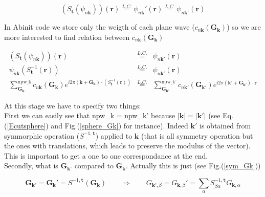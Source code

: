 \documentclass[a4paper,12pt]{report}
\begin{document}
\begin{equation}
\left( S_{\mathbf{t}} \left( \psi_{n\mathbf{k}}\right) \right) (\mathbf{r}) \stackrel{L.C.}{=} \psi_{n\mathbf{k}}'(\mathbf{r}) \stackrel{L.C.}{=} \psi_{n\mathbf{k}'}(\mathbf{r}) \label{symrel_psikkprime}
\end{equation}

In Abinit code we store only the weigth of each plane wave ($c_{n\mathbf{k}}(\mathbf{G_{\mathbf{k}}})$) so we are more interested to find relation between $c_{n\mathbf{k}}(\mathbf{G_{\mathbf{k}}})$

\begin{eqnarray}
\left( S_{\mathbf{t}} \left( \psi_{n\mathbf{k}}\right) \right) (\mathbf{r}) &\stackrel{L.C.}{=}&  \psi_{n\mathbf{k}'}(\mathbf{r}) \nonumber \\
\psi_{n\mathbf{k}}(S_{\mathbf{t}}^{-1} (\mathbf{r})) &\stackrel{L.C.}{=}&  \psi_{n\mathbf{k}'}(\mathbf{r}) \nonumber \\
\sum_{\mathbf{G_{\mathbf{k}}}}^{\text{npw\_k}} c_{n\mathbf{k}}(\mathbf{G}_{\mathbf{k}}) e^{i2\pi \left(  \mathbf{k} +\mathbf{G}_{\mathbf{k}}\right)\cdotp(S_{\mathbf{t}}^{-1} (\mathbf{r}))} &\stackrel{L.C.}{=}& \sum_{\mathbf{G_{\mathbf{k}'}}}^{\text{npw\_k'}} c_{n\mathbf{k}'}(\mathbf{G}_{\mathbf{k}'}) e^{i2\pi \left(  \mathbf{k}' +\mathbf{G}_{\mathbf{k}'}\right)\cdotp\mathbf{r}}
\end{eqnarray}

At this stage we have to specify two things:\\
First we can easily see that npw\_k = npw\_k' because $\vert\mathbf{k}\vert =\vert\mathbf{k}'\vert$ (see Eq.(\ref{Ecutsphere}) and Fig.(\ref{sphere_Gk}) for instance). Indeed $\mathbf{k}'$ is obtained from symmorphic operation ($S^{-1,\mathtt{t}}$) applied to $\mathbf{k}$ (that is all symmetry operation but the ones with translations, which leads to preserve the modulus of the vector). This is important to get a one to one correspondance at the end.\\
Secondly, what is $\mathbf{G}_{\mathbf{k}'}$ compared to $\mathbf{G}_{\mathbf{k}}$. Actually this is just (see Fig.(\ref{sym_Gk}))

\begin{equation}
\mathbf{G}_{\mathbf{k}'} = \mathbf{G}_{\mathbf{k}}' = S^{-1,{\mathtt{t}}}\left( \mathbf{G}_{\mathbf{k}}\right)  \qquad \Rightarrow  \qquad G_{\mathbf{k}',\beta} =G_{\mathbf{k},\beta}' = \sum_{\alpha} S_{\beta\alpha}^{-1,{\mathtt{t}}} G_{\mathbf{k},\alpha}
\end{equation}
\end{document}
